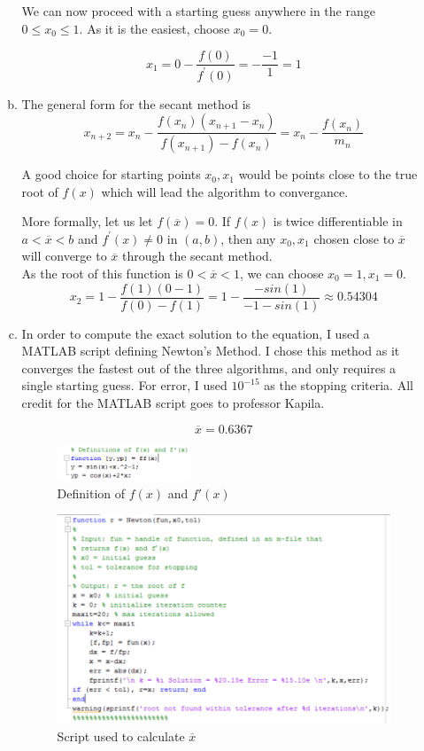 \documentclass[11pt]{article}
\begin{document}
\begin{enumerate}
\begin{enumerate}[(a)]
		We can now proceed with a starting guess anywhere in the range $0 \leq x_0 \leq 1$. As it is the easiest, choose $x_0 = 0$.

		$$x_1 = 0 - \frac{f(0)}{f^{'}(0)} = -\frac{-1}{1} = 1$$

		\item The general form for the secant method is
			$$x_{n+2} = x_{n} - \frac{f(x_n)(x_{n+1}-x_n)}{f(x_{n+1})-f(x_n)} = x_n - \frac{f(x_n)}{m_n} $$

			A good choice for starting points $x_0, x_1$ would be points close to the true root of $f(x)$ which will lead the
			algorithm to convergance.

			More formally, let us let $f(\overline{x})=0$. If $f(x)$ is twice differentiable in
			$a < \overline{x} < b$ and $f^{'}(x) \neq 0$ in $(a,b)$, then any $x_0, x_1$ chosen close to $\overline{x}$ will
			converge to $\overline{x}$ through the secant method. \\

			As the root of this function is $0 < \overline{x} < 1$, we can choose $x_0 = 1, x_1 = 0$.
			$$x_2 = 1 - \frac{f(1)(0-1)}{f(0)-f(1)} = 1- \frac{-sin(1)}{-1-sin(1)} \approx 0.54304$$

		\item In order to compute the exact solution to the equation, I used a MATLAB script defining Newton's Method. I chose this
			method as it converges the fastest out of the three algorithms, and only requires a single starting guess. For error,
			I used $10^{-15}$ as the stopping criteria. All credit for the MATLAB script goes to professor Kapila.

			$$\overline{x} = 0.6367$$

			\begin{figure}[H]
				\centering
				\includegraphics[width=0.4\textwidth]{q2_fundef.PNG}
				\caption{Definition of $f(x)$ and $f'(x)$}
			\end{figure}

			\begin{figure}[H]
				\centering
				\includegraphics[width=\textwidth]{q2_newtonscript.PNG}
				\caption{Script used to calculate $\overline{x}$}
			\end{figure}


\end{enumerate}
\end{enumerate}
\end{document}
